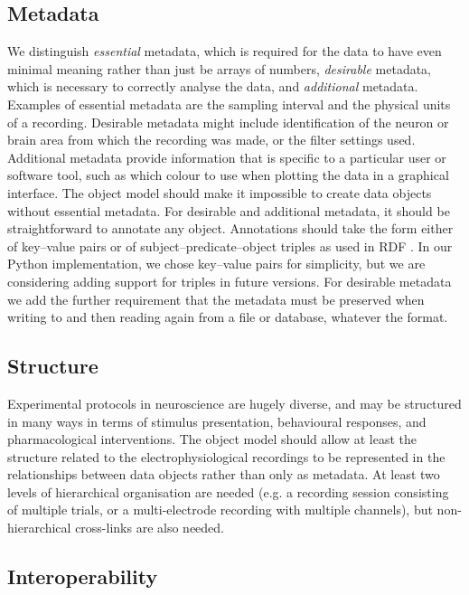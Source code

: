 \documentclass{frontiers}
\begin{document}
\subsection{Metadata}

We distinguish \emph{essential} metadata, which is required for the data to have even minimal meaning rather than just be arrays of numbers, \emph{desirable} metadata, which is necessary to correctly analyse the data, and \emph{additional} metadata.
Examples of essential metadata are the sampling interval and the physical units of a recording.
Desirable metadata might include identification of the neuron or brain area from which the recording was made, or the filter settings used.
Additional metadata provide information that is specific to a particular user or software tool, such as which colour to use when plotting the data in a graphical interface.
The object model should make it impossible to create data objects without essential metadata.
For desirable and additional metadata, it should be straightforward to annotate any object. 
Annotations should take the form either of key--value pairs or of subject--predicate--object triples as used in RDF \citep{RDF-PRIMER}. 
In our Python implementation, we chose key--value pairs for simplicity, but we are considering adding support for triples in future versions.
For desirable metadata we add the further requirement that the metadata must be preserved when writing to and then reading again from a file or database, whatever the format.

\subsection{Structure}

Experimental protocols in neuroscience are hugely diverse, and may be structured in many ways in terms of stimulus presentation, behavioural responses, and pharmacological interventions. The object model should allow at least the structure related to the electrophysiological recordings to be represented in the relationships between data objects rather than only as metadata. At least two levels of hierarchical organisation are needed (e.g. a recording session consisting of multiple trials, or a multi-electrode recording with multiple channels), but non-hierarchical cross-links are also needed.


\subsection{Interoperability}
\end{document}
